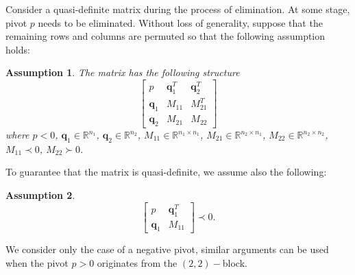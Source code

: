 \documentclass[a4paper]{article}
\newcommand{\qvec}{\mathbf q}
\newcommand{\0}{\mathbf 0}
\newtheorem{assumption}{Assumption}
\begin{document}


Consider a quasi-definite matrix during the process of elimination. At some stage, pivot $p$ needs to be eliminated. Without loss of generality, suppose that the remaining rows and columns are permuted so that the following assumption holds:

\begin{assumption}
\label{assum:structure}
The matrix has the following structure
\[
\begin{bmatrix}
p & \qvec_1^T & \qvec_2^T \\
\qvec_1 & M_{11} & M_{21}^T \\
\qvec_2 & M_{21} & M_{22}
\end{bmatrix}
\]
where $p<0$, $\qvec_1\in\mathbb R^{n_1}$, $\qvec_2\in\mathbb R^{n_2}$, $M_{11}\in\mathbb R^{n_1\times n_1}$, $M_{21}\in\mathbb R^{n_2\times n_1}$, $M_{22}\in\mathbb R^{n_2\times n_2}$, $M_{11}\prec 0$, $M_{22}\succ0$.
\end{assumption}

To guarantee that the matrix is quasi-definite, we assume also the following:
\begin{assumption}
\label{assum:quasi}
\[\begin{bmatrix}
p & \qvec_1^T \\ \qvec_1 & M_{11}
\end{bmatrix}\prec0.
\]
\end{assumption}

We consider only the case of a negative pivot, similar arguments can be used when the pivot $p>0$ originates from the $(2,2)-$block.
\end{document}
